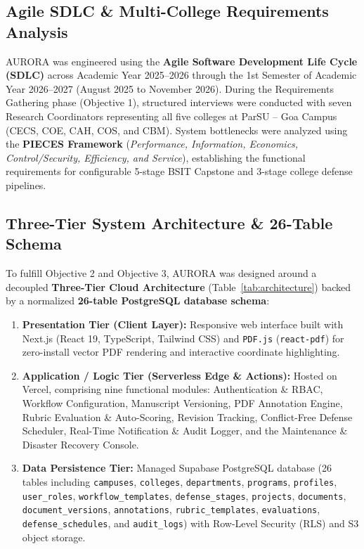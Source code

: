\documentclass[sigplan,screen,nonacm]{acmart}
\begin{document}
\subsection{Agile SDLC & Multi-College Requirements Analysis}
AURORA was engineered using the \textbf{Agile Software Development Life Cycle (SDLC)} across Academic Year 2025--2026 through the 1st Semester of Academic Year 2026--2027 (August 2025 to November 2026). During the Requirements Gathering phase (Objective 1), structured interviews were conducted with seven Research Coordinators representing all five colleges at ParSU -- Goa Campus (CECS, COE, CAH, COS, and CBM). System bottlenecks were analyzed using the \textbf{PIECES Framework} (\textit{Performance, Information, Economics, Control/Security, Efficiency, and Service}), establishing the functional requirements for configurable 5-stage BSIT Capstone and 3-stage college defense pipelines.

\subsection{Three-Tier System Architecture & 26-Table Schema}
To fulfill Objective 2 and Objective 3, AURORA was designed around a decoupled \textbf{Three-Tier Cloud Architecture} (Table~\ref{tab:architecture}) backed by a normalized \textbf{26-table PostgreSQL database schema}:
\begin{enumerate}
  \item \textbf{Presentation Tier (Client Layer):} Responsive web interface built with Next.js (React 19, TypeScript, Tailwind CSS) and \texttt{PDF.js} (\texttt{react-pdf}) for zero-install vector PDF rendering and interactive coordinate highlighting.
  \item \textbf{Application / Logic Tier (Serverless Edge \& Actions):} Hosted on Vercel, comprising nine functional modules: Authentication \& RBAC, Workflow Configuration, Manuscript Versioning, PDF Annotation Engine, Rubric Evaluation \& Auto-Scoring, Revision Tracking, Conflict-Free Defense Scheduler, Real-Time Notification \& Audit Logger, and the Maintenance \& Disaster Recovery Console.
  \item \textbf{Data Persistence Tier:} Managed Supabase PostgreSQL database (26 tables including \texttt{campuses}, \texttt{colleges}, \texttt{departments}, \texttt{programs}, \texttt{profiles}, \texttt{user\_roles}, \texttt{workflow\_templates}, \texttt{defense\_stages}, \texttt{projects}, \texttt{documents}, \texttt{document\_versions}, \texttt{annotations}, \texttt{rubric\_templates}, \texttt{evaluations}, \texttt{defense\_schedules}, and \texttt{audit\_logs}) with Row-Level Security (RLS) and S3 object storage.
\end{enumerate}
\end{document}
